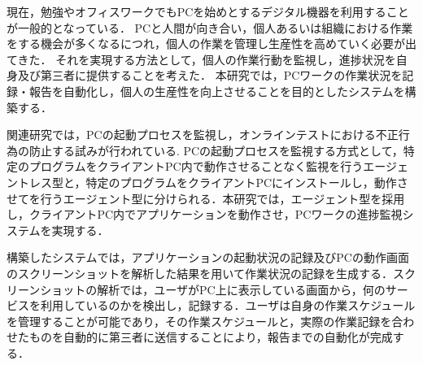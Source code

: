 現在，勉強やオフィスワークでもPCを始めとするデジタル機器を利用することが一般的となっている．
PCと人間が向き合い，個人あるいは組織における作業をする機会が多くなるにつれ，個人の作業を管理し生産性を高めていく必要が出てきた．
それを実現する方法として，個人の作業行動を監視し，進捗状況を自身及び第三者に提供することを考えた．
本研究では，PCワークの作業状況を記録・報告を自動化し，個人の生産性を向上させることを目的としたシステムを構築する．

関連研究では，PCの起動プロセスを監視し，オンラインテストにおける不正行為の防止する試みが行われている.
PCの起動プロセスを監視する方式として，特定のプログラムをクライアントPC内で動作させることなく監視を行うエージェントレス型と，特定のプログラムをクライアントPCにインストールし，動作させてを行うエージェント型に分けられる．本研究では，エージェント型を採用し，クライアントPC内でアプリケーションを動作させ，PCワークの進捗監視システムを実現する．

構築したシステムでは，アプリケーションの起動状況の記録及びPCの動作画面のスクリーンショットを解析した結果を用いて作業状況の記録を生成する．スクリーンショットの解析では，ユーザがPC上に表示している画面から，何のサービスを利用しているのかを検出し，記録する．ユーザは自身の作業スケジュールを管理することが可能であり，その作業スケジュールと，実際の作業記録を合わせたものを自動的に第三者に送信することにより，報告までの自動化が完成する．
